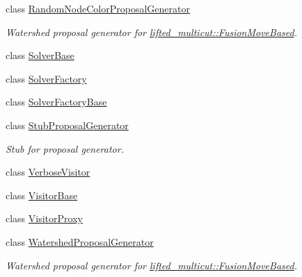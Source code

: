 \begin{DoxyCompactItemize}
\item 
class \hyperlink{classnifty_1_1graph_1_1optimization_1_1common_1_1RandomNodeColorProposalGenerator}{Random\+Node\+Color\+Proposal\+Generator}
\begin{DoxyCompactList}\small\item\em Watershed proposal generator for \hyperlink{classnifty_1_1graph_1_1optimization_1_1lifted__multicut_1_1FusionMoveBased}{lifted\+\_\+multicut\+::\+Fusion\+Move\+Based}. \end{DoxyCompactList}\item 
class \hyperlink{classnifty_1_1graph_1_1optimization_1_1common_1_1SolverBase}{Solver\+Base}
\item 
class \hyperlink{classnifty_1_1graph_1_1optimization_1_1common_1_1SolverFactory}{Solver\+Factory}
\item 
class \hyperlink{classnifty_1_1graph_1_1optimization_1_1common_1_1SolverFactoryBase}{Solver\+Factory\+Base}
\item 
class \hyperlink{classnifty_1_1graph_1_1optimization_1_1common_1_1StubProposalGenerator}{Stub\+Proposal\+Generator}
\begin{DoxyCompactList}\small\item\em Stub for proposal generator. \end{DoxyCompactList}\item 
class \hyperlink{classnifty_1_1graph_1_1optimization_1_1common_1_1VerboseVisitor}{Verbose\+Visitor}
\item 
class \hyperlink{classnifty_1_1graph_1_1optimization_1_1common_1_1VisitorBase}{Visitor\+Base}
\item 
class \hyperlink{classnifty_1_1graph_1_1optimization_1_1common_1_1VisitorProxy}{Visitor\+Proxy}
\item 
class \hyperlink{classnifty_1_1graph_1_1optimization_1_1common_1_1WatershedProposalGenerator}{Watershed\+Proposal\+Generator}
\begin{DoxyCompactList}\small\item\em Watershed proposal generator for \hyperlink{classnifty_1_1graph_1_1optimization_1_1lifted__multicut_1_1FusionMoveBased}{lifted\+\_\+multicut\+::\+Fusion\+Move\+Based}. \end{DoxyCompactList}\end{DoxyCompactItemize}
